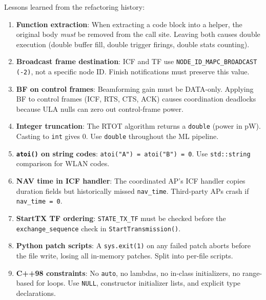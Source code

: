 \documentclass[11pt,a4paper]{article}
\begin{document}
Lessons learned from the refactoring history:

\begin{enumerate}
  \item \textbf{Function extraction}: When extracting a code block into a helper, the original body \emph{must} be removed from the call site.  Leaving both causes double execution (double buffer fill, double trigger firings, double stats counting).

  \item \textbf{Broadcast frame destination}: ICF and TF use \texttt{NODE\_ID\_MAPC\_BROADCAST (-2)}, not a specific node ID.  Finish notifications must preserve this value.

  \item \textbf{BF on control frames}: Beamforming gain must be DATA-only.  Applying BF to control frames (ICF, RTS, CTS, ACK) causes coordination deadlocks because ULA nulls can zero out control-frame power.

  \item \textbf{Integer truncation}: The RTOT algorithm returns a \texttt{double} (power in pW).  Casting to \texttt{int} gives 0.  Use \texttt{double} throughout the ML pipeline.

  \item \textbf{\texttt{atoi()} on string codes}: \texttt{atoi("A") = atoi("B") = 0}.  Use \texttt{std::string} comparison for WLAN codes.

  \item \textbf{NAV time in ICF handler}: The coordinated AP's ICF handler copies duration fields but historically missed \texttt{nav\_time}.  Third-party APs crash if \texttt{nav\_time = 0}.

  \item \textbf{StartTX TF ordering}: \texttt{STATE\_TX\_TF} must be checked before the \texttt{exchange\_sequence} check in \texttt{StartTransmission()}.

  \item \textbf{Python patch scripts}: A \texttt{sys.exit(1)} on any failed patch aborts before the file write, losing all in-memory patches.  Split into per-file scripts.

  \item \textbf{C++98 constraints}: No \texttt{auto}, no lambdas, no in-class initializers, no range-based for loops.  Use \texttt{NULL}, constructor initializer lists, and explicit type declarations.

\end{enumerate}
\end{document}
